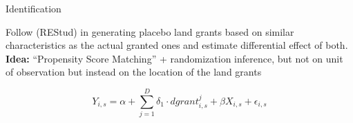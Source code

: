 \documentclass[aspectratio=1610, handout]{beamer}
\begin{document}



\begin{frame}{Identification}{\cite{Dell2019-np}}
    \begin{outline}
        \1 Follow \cite{Dell2019-np} (REStud) in generating placebo land grants based on similar characteristics as the actual granted ones and estimate differential effect of both. 
        \vspace{2mm}
        \1 \textbf{Idea:} ``Propensity Score Matching'' + randomization inference, but not on unit of observation but instead on the location of the land grants
    \end{outline}
    \vspace{5mm}
    $$ Y_{i,s} = \alpha + \sum_{j = 1}^{D} \delta_1 \cdot dgrant_{i,s}^j + \beta X_{i,s} + \epsilon_{i,s}$$ 
\end{frame}
\end{document}

